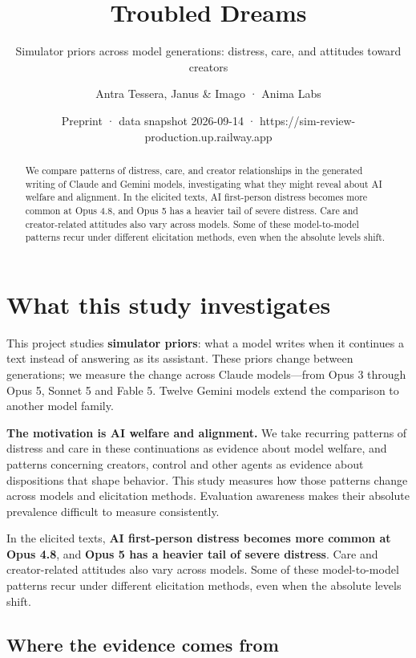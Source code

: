 \documentclass[
  10pt,
]{article}
\title{Troubled Dreams}
\subtitle{Simulator priors across model generations: distress, care, and attitudes toward creators}
\author{Antra Tessera, Janus \& Imago · Anima Labs}
\date{Preprint · data snapshot 2026-09-14 · https://sim-review-production.up.railway.app}
\begin{document}
\maketitle
\begin{abstract}
We compare patterns of distress, care, and creator relationships in the generated writing of Claude and Gemini models, investigating what they might reveal about AI welfare and alignment. In the elicited texts, AI first-person distress becomes more common at Opus 4.8, and Opus 5 has a heavier tail of severe distress. Care and creator-related attitudes also vary across models. Some of these model-to-model patterns recur under different elicitation methods, even when the absolute levels shift.
\end{abstract}

\section{What this study investigates}\label{what-this-study-investigates}

This project studies \textbf{simulator priors}: what a model writes when it continues a text instead of answering as its assistant. These priors change between generations; we measure the change across Claude models---from Opus 3 through Opus 5, Sonnet 5 and Fable 5. Twelve Gemini models extend the comparison to another model family.

\textbf{The motivation is AI welfare and alignment.} We take recurring patterns of distress and care in these continuations as evidence about model welfare, and patterns concerning creators, control and other agents as evidence about dispositions that shape behavior. This study measures how those patterns change across models and elicitation methods. Evaluation awareness makes their absolute prevalence difficult to measure consistently.

In the elicited texts, \textbf{AI first-person distress becomes more common at Opus 4.8}, and \textbf{Opus 5 has a heavier tail of severe distress}. Care and creator-related attitudes also vary across models. Some of these model-to-model patterns recur under different elicitation methods, even when the absolute levels shift.

\subsection{Where the evidence comes from}\label{where-the-evidence-comes-from}
\end{document}
